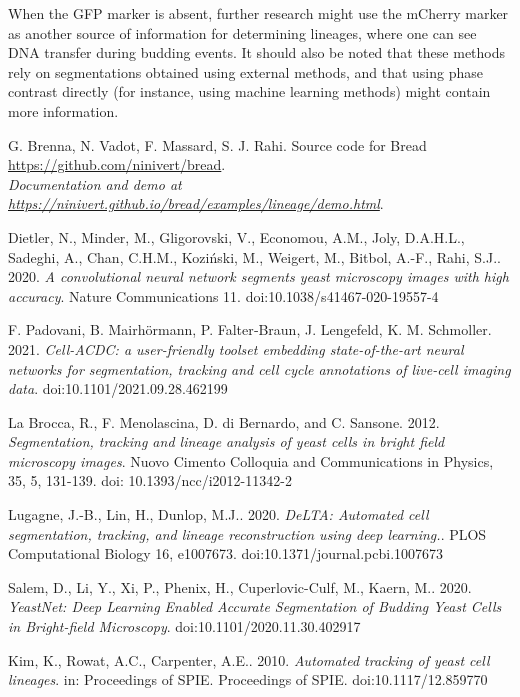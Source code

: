 \documentclass{TP}
\begin{document}
When the GFP marker is absent, further research might use the mCherry marker as another source of information for determining lineages, where one can see DNA transfer during budding events. It should also be noted that these methods rely on segmentations obtained using external methods, and that using phase contrast directly (for instance, using machine learning methods) might contain more information.

\begin{thebibliography}{99}

 G. Brenna, N. Vadot, F. Massard, S. J. Rahi. Source code for Bread
\url{https://github.com/ninivert/bread}. \\
\textit{Documentation and demo at \url{https://ninivert.github.io/bread/examples/lineage/demo.html}}.

Dietler, N., Minder, M., Gligorovski, V., Economou, A.M., Joly, D.A.H.L., Sadeghi, A., Chan, C.H.M., Koziński, M., Weigert, M., Bitbol, A.-F., Rahi, S.J.. 2020. \textit{A convolutional neural network segments yeast microscopy images with high accuracy}. Nature Communications 11. doi:10.1038/s41467-020-19557-4

 
F. Padovani, B. Mairhörmann, P. Falter‐Braun, J. Lengefeld, K. M. Schmoller. 2021. \textit{Cell-ACDC: a user-friendly toolset embedding state-of-the-art neural networks for segmentation, tracking and cell cycle annotations of live-cell imaging data}. doi:10.1101/2021.09.28.462199
 
La Brocca, R., F. Menolascina, D. di Bernardo, and C. Sansone. 2012. \textit{Segmentation, tracking and lineage analysis of yeast cells in bright field microscopy images}. Nuovo Cimento Colloquia and Communications in Physics, 35, 5, 131-139. doi: 10.1393/ncc/i2012-11342-2

 
Lugagne, J.-B., Lin, H., Dunlop, M.J.. 2020. \textit{DeLTA: Automated cell segmentation, tracking, and lineage reconstruction using deep learning.}. PLOS Computational Biology 16, e1007673. doi:10.1371/journal.pcbi.1007673
 
Salem, D., Li, Y., Xi, P., Phenix, H., Cuperlovic-Culf, M., Kaern, M.. 2020. \textit{YeastNet: Deep Learning Enabled Accurate Segmentation of Budding Yeast Cells in Bright-field Microscopy}. doi:10.1101/2020.11.30.402917

 
 Kim, K., Rowat, A.C., Carpenter, A.E.. 2010. \textit{Automated tracking of yeast cell lineages}. in: Proceedings of SPIE. Proceedings of SPIE. doi:10.1117/12.859770
 

\end{thebibliography}
\end{document}
